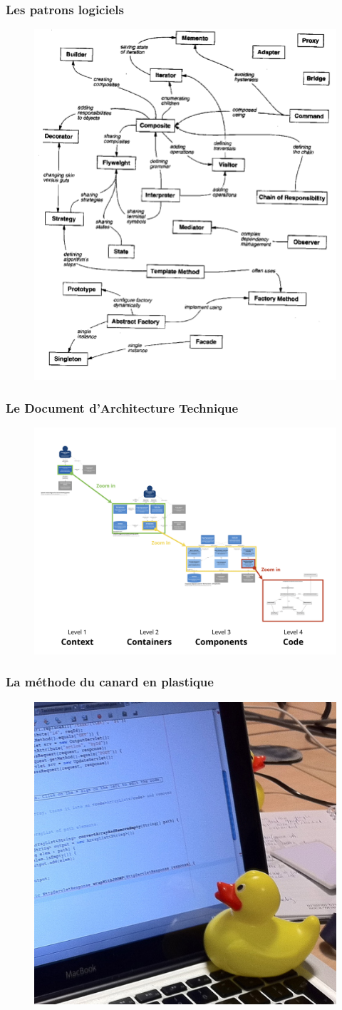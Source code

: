 \begin{frame}
    \frametitle{Les patrons logiciels}

    \begin{figure}
        \centering
        \includegraphics[height=0.5\linewidth]{figures/introduction/patrons}
        \label{fig:patrons}
    \end{figure}
\end{frame}

\begin{frame}
    \frametitle{Le Document d'Architecture Technique}

    \begin{figure}
        \centering
        \includegraphics[height=0.5\linewidth]{figures/introduction/c4-overview}
        \label{fig:dat}
    \end{figure}
\end{frame}

\begin{frame}
    \frametitle{La méthode du canard en plastique}

    \begin{figure}
        \centering
        \includegraphics[height=0.5\linewidth]{figures/introduction/canard}
        \label{fig:canard}
    \end{figure}
\end{frame}
